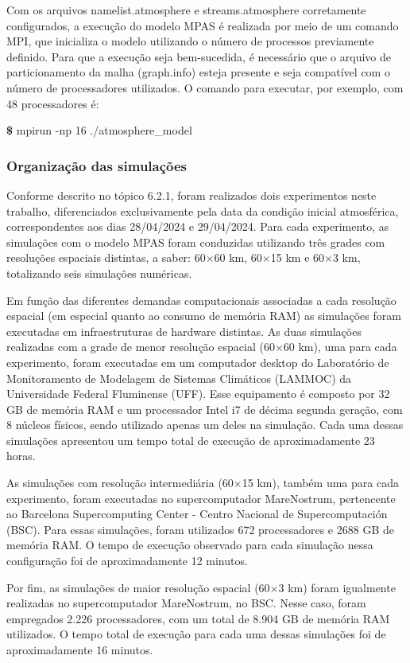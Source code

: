 \documentclass[12pt,a4paper,oneside]{book}
\begin{document}
Com os arquivos namelist.atmosphere e streams.atmosphere corretamente configurados, a execução do modelo MPAS é realizada por meio de um comando MPI, que inicializa o modelo utilizando o número de processos previamente definido. Para que a execução seja bem-sucedida, é necessário que o arquivo de particionamento da malha (graph.info) esteja presente e seja compatível com o número de processadores utilizados. O comando para executar, por exemplo, com 48 processadores é:

\textbf{\$} mpirun -np 16 ./atmosphere\_model

\subsubsection{Organização das simulações}

Conforme descrito no tópico 6.2.1, foram realizados dois experimentos neste trabalho, diferenciados exclusivamente pela data da condição inicial atmosférica, correspondentes aos dias 28/04/2024 e 29/04/2024. Para cada experimento, as simulações com o modelo MPAS foram conduzidas utilizando três grades com resoluções espaciais distintas, a saber: 60$\times$60 km, 60$\times$15 km e 60$\times$3 km, totalizando seis simulações numéricas.

Em função das diferentes demandas computacionais associadas a cada resolução espacial (em especial quanto ao consumo de memória RAM) as simulações foram executadas em infraestruturas de hardware distintas. As duas simulações realizadas com a grade de menor resolução espacial (60$\times$60 km), uma para cada experimento, foram executadas em um computador desktop do Laboratório de Monitoramento de Modelagem de Sistemas Climáticos (LAMMOC) da Universidade Federal Fluminense (UFF). Esse equipamento é composto por 32 GB de memória RAM e um processador Intel i7 de décima segunda geração, com 8 núcleos físicos, sendo utilizado apenas um deles na simulação. Cada uma dessas simulações apresentou um tempo total de execução de aproximadamente 23 horas.

As simulações com resolução intermediária (60$\times$15 km), também uma para cada experimento, foram executadas no supercomputador MareNostrum, pertencente ao Barcelona Supercomputing Center - Centro Nacional de Supercomputación (BSC). Para essas simulações, foram utilizados 672 processadores e 2688 GB de memória RAM. O tempo de execução observado para cada simulação nessa configuração foi de aproximadamente 12 minutos.

Por fim, as simulações de maior resolução espacial (60$\times$3 km) foram igualmente realizadas no supercomputador MareNostrum, no BSC. Nesse caso, foram empregados 2.226 processadores, com um total de 8.904 GB de memória RAM utilizados. O tempo total de execução para cada uma dessas simulações foi de aproximadamente 16 minutos.
\end{document}

